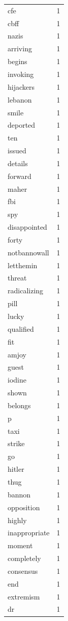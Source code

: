 \begin{tabular}{lr}
cfe & 1 \\
cbff & 1 \\
nazis & 1 \\
arriving & 1 \\
begins & 1 \\
invoking & 1 \\
hijackers & 1 \\
lebanon & 1 \\
smile & 1 \\
deported & 1 \\
ten & 1 \\
issued & 1 \\
details & 1 \\
forward & 1 \\
maher & 1 \\
fbi & 1 \\
spy & 1 \\
disappointed & 1 \\
forty & 1 \\
notbannowall & 1 \\
letthemin & 1 \\
threat & 1 \\
radicalizing & 1 \\
pill & 1 \\
lucky & 1 \\
qualified & 1 \\
fit & 1 \\
amjoy & 1 \\
guest & 1 \\
iodine & 1 \\
shown & 1 \\
belongs & 1 \\
p & 1 \\
taxi & 1 \\
strike & 1 \\
go & 1 \\
hitler & 1 \\
thug & 1 \\
bannon & 1 \\
opposition & 1 \\
highly & 1 \\
inappropriate & 1 \\
moment & 1 \\
completely & 1 \\
consensus & 1 \\
end & 1 \\
extremism & 1 \\
dr & 1 \\

\end{tabular}
